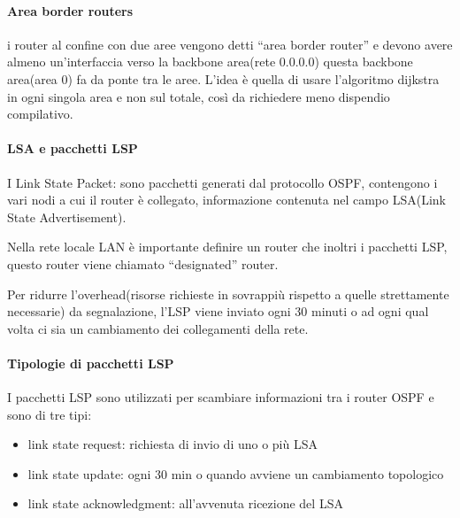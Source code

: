 \paragraph{Area border routers}
i router al confine con due aree vengono detti “area border router” e devono avere almeno un'interfaccia verso la backbone area(rete 0.0.0.0)
questa backbone area(area 0) fa da ponte tra le aree.
L'idea è quella di usare l'algoritmo dijkstra in ogni singola area e non sul totale, così da richiedere meno dispendio compilativo.

\paragraph{LSA e pacchetti LSP}
I Link State Packet: sono pacchetti generati dal protocollo OSPF, contengono i vari nodi a cui il router è collegato, informazione contenuta nel campo LSA(Link State Advertisement).

Nella rete locale LAN è importante definire un router che inoltri i pacchetti LSP, questo router viene chiamato “designated” router.

Per ridurre l'overhead(risorse richieste in sovrappiù rispetto a quelle strettamente necessarie) da segnalazione, l'LSP viene inviato ogni 30 minuti o ad ogni qual volta ci sia un cambiamento dei collegamenti della rete.

\paragraph{Tipologie di pacchetti LSP}
I pacchetti LSP sono utilizzati per scambiare informazioni tra i router OSPF e sono di tre tipi:
\begin{itemize}
    \item link state request: richiesta di invio di uno o più LSA
    \item link state update: ogni 30 min o quando avviene un cambiamento topologico
    \item link state acknowledgment: all'avvenuta ricezione del LSA
\end{itemize}
